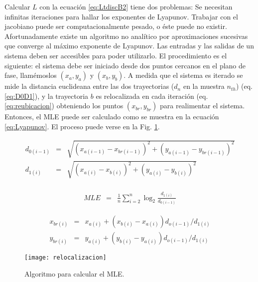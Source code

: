 Calcular $L$ con la ecuación \ref{eq:LtdiscB2} tiene dos problemas:
Se necesitan infinitas iteraciones para hallar los exponentes de Lyapunov.
Trabajar con el jacobiano puede ser computacionalmente pesado, o éste puede no existir.
Afortunadamente existe un algoritmo no analítico por aproximaciones sucesivas que converge al máximo exponente de Lyapunov.
Las entradas y las salidas de un sistema deben ser accesibles para poder utilizarlo.
El procedimiento es el siguiente: el sistema debe ser iniciado desde dos puntos cercanos en el plano de fase, llamémoslos $(x_a,y_a)$ y $(x_b,y_b)$.
A medida que el sistema es iterado se mide la distancia euclideana entre las dos trayectorias ($d_n$ en la muestra $n_{th}$) (eq. \ref{eq:D0D1}), y la trayectoria $b$ es relocalizada en cada iteración (eq. \ref{eq:reubicacion}) obteniendo los puntos $(x_{br},y_{br})$ para realimentar el sistema.
Entonces, el MLE puede ser calculado como se muestra en la ecuación \ref{eq:Lyapunov}.
El proceso puede verse en la Fig. \ref{fig:relocalizacion}.

\begin{eqnarray}\label{eq:D0D1}
d_{0(i-1)}&=& \sqrt{(x_{a(i-1)}-x_{br(i-1)})^2+(y_{a(i-1)}-y_{br(i-1)})^2}\nonumber\\
d_{1(i)}&=& \sqrt{(x_{a(i)}-x_{b(i)})^2+(y_{a(i)}-y_{b(i)})^2}\\
\nonumber
\end{eqnarray}

\begin{eqnarray}\label{eq:Lyapunov}
MLE &=& \frac{1}{n} \sum_{i=2}^{n} \log_2{\frac{d_{1(i)}}{d_{0(i-1)}}}
\end{eqnarray}

\begin{eqnarray}\label{eq:reubicacion}
x_{br(i)}&=& x_{a(i)}+(x_{b(i)}-x_{a(i)})d_{o(i-1)}/d_{1(i)} \nonumber\\
y_{br(i)}&=& y_{a(i)}+(y_{b(i)}-y_{a(i)})d_{o(i-1)}/d_{1(i)}
\end{eqnarray}

\begin{figure}
	\centering
	\texttt{[image: relocalizacion]}\\
	\caption{Algoritmo para calcular el MLE.}\label{fig:relocalizacion}
\end{figure}

